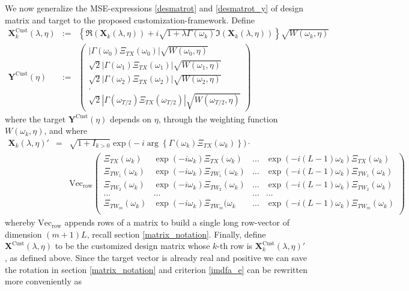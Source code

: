 \documentclass[a4paper]{book}
\begin{document}
We now generalize the MSE-expressions \ref{desmatrot} and \ref{desmatrot_y} of design matrix and target to the proposed customization-framework. Define
\begin{eqnarray*}
\mathbf{X}_{k}^{\textrm{Cust}}(\lambda,\eta)&:=&\left\{\Re(\mathbf{X}_{k}(\lambda,\eta))+i\sqrt{1+ \lambda\Gamma(\omega_k)}\Im(\mathbf{X}_{k}(\lambda,\eta))\right\}\sqrt{W(\omega_k,\eta)}\\
\mathbf{Y}^{\textrm{Cust}}(\eta)&:=& \left(\begin{array}{c}\left|\Gamma(\omega_0)\Xi_{TX}(\omega_0)\right|\sqrt{W(\omega_0,\eta)}\\ 
\sqrt{2}|\Gamma(\omega_1)\Xi_{TX}(\omega_1)|\sqrt{W(\omega_1,\eta)}\\
\sqrt{2}|\Gamma(\omega_2)\Xi_{TX}(\omega_2)|\sqrt{W(\omega_2,\eta)}\\
.\\
\sqrt{2}|\Gamma(\omega_{T/2})\Xi_{TX}(\omega_{T/2})|\sqrt{W(\omega_{T/2},\eta)}
\end{array}\right)
\end{eqnarray*}
where the target $\mathbf{Y}^{\textrm{Cust}}(\eta)$ depends on $\eta$, through the weighting function $W(\omega_k,\eta)$, and where 
\begin{eqnarray*}
\mathbf{X}_{k}(\lambda,\eta)'&=&\sqrt{1+I_{k>0}}\exp\big(-i\arg\left\{\Gamma(\omega_k)\Xi_{TX}(\omega_k)\right\}\big)\cdot\nonumber\\
&&\textrm{Vec}_\textrm{row}\left(\begin{array}{ccccc} \Xi_{TX}(\omega_k)& \exp(-i\omega_k)\Xi_{TX}(\omega_k)&...& \exp(-i(L-1)\omega_k)\Xi_{TX}(\omega_k)\\
 \Xi_{TW_1}(\omega_k)& \exp(-i\omega_k)\Xi_{TW_1}(\omega_k)& ...& \exp(-i(L-1)\omega_k)\Xi_{TW_1}(\omega_k)\\
 \Xi_{TW_2}(\omega_k)& \exp(-i\omega_k)\Xi_{TW_2}(\omega_k)& ...& \exp(-i(L-1)\omega_k)\Xi_{TW_2}(\omega_k)\\
...&...&...&...\\
 \Xi_{TW_m}(\omega_k)& \exp(-i\omega_k)\Xi_{TW_m}(\omega_k&...& \exp(-i(L-1)\omega_k)\Xi_{TW_m}(\omega_k)\\
\end{array}\right)
\end{eqnarray*}
whereby $\textrm{Vec}_\textrm{row}$ appends rows of a matrix to build a single long row-vector of dimension $(m+1)L$, recall section \ref{matrix_notation}. Finally, define $\mathbf{X}^{\textrm{Cust}}(\lambda,\eta)$ to be the customized design matrix whose $k$-th row is $\mathbf{X}_{k}^{\textrm{Cust}}(\lambda,\eta)'$, as defined above. Since the target vector is already real and positive we can save the rotation in section \ref{matrix_notation} and criterion   \ref{imdfa_e} can be rewritten more conveniently as 
\end{document}
